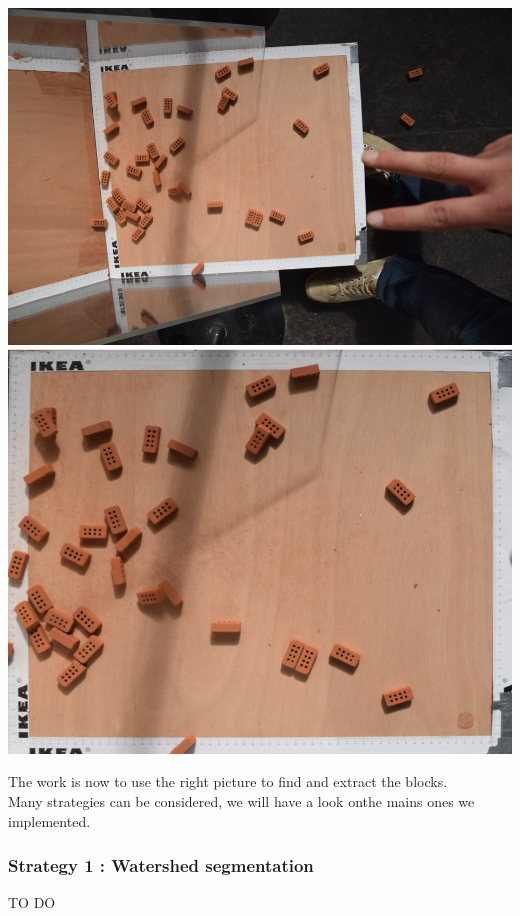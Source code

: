 \documentclass{article}
\begin{document}
\begin{center}
    \includegraphics[scale=0.4]{images/result_1.png}  
    \includegraphics[scale=0.4]{images/resul_1.png}      
\end{center}

The work is now to use the right picture to find and extract the blocks.\\
Many strategies can be considered, we will have a look onthe mains ones we implemented.

\subsubsection{Strategy 1 : Watershed segmentation}

TO DO
\end{document}
